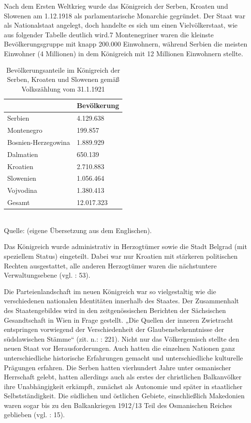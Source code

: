 Nach dem Ersten Weltkrieg wurde das Königreich der Serben, Kroaten und Slowenen am 1.12.1918 als parlamentarische Monarchie gegründet. Der Staat war als Nationalstaat angelegt, doch handelte es sich um einen Vielvölkerstaat, wie aus folgender Tabelle deutlich wird.7 Montenegriner waren die kleinste Bevölkerungsgruppe mit knapp 200.000 Einwohnern, während Serbien die meisten Einwohner (4 Millionen) in dem Königreich mit 12 Millionen Einwohnern stellte.
\begin{table}[H]
\caption[Bevölkerungsanteile im Königreich der Serben, Kroaten und Slowenen]{Bevölkerungsanteile im Königreich der Serben, Kroaten und Slowenen gemäß Volkszählung vom 31.1.1921}
\center

\begin{tabular}{|R{46mm}|R{25mm}|}\hline
&Bevölkerung\\\hline
Serbien &4.129.638\\\hline
Montenegro&199.857\\\hline
Bosnien-Herzegowina&1.889.929\\\hline
Dalmatien&650.139\\\hline
Kroatien&2.710.883\\\hline
Slowenien&1.056.464\\\hline
Vojvodina&1.380.413\\\hline
Gesamt&12.017.323\\\hline
\end{tabular}\\
\vspace{0,5cm}
Quelle: \cite{beardradin} (eigene Übersetzung aus dem Englischen).
\end{table}
Das Königreich wurde administrativ in Herzogtümer sowie die Stadt Belgrad (mit speziellem Status) eingeteilt. Dabei war nur Kroatien mit stärkeren politischen Rechten ausgestattet, alle anderen Herzogtümer waren die nächstuntere Verwaltungsebene (vgl. \cite{sevic} : 53).\par
Die Parteienlandschaft im neuen Königreich war so vielgestaltig wie die verschiedenen nationalen Identitäten innerhalb des Staates. Der Zusammenhalt des Staatengebildes wird in den zeitgenössischen Berichten der Sächsischen Gesandtschaft in Wien in Frage gestellt. „Die Quellen der inneren Zwietracht entspringen vorwiegend der Verschiedenheit der Glaubensbekenntnisse der südslawischen Stämme“ (zit. n.: \cite{opitz} : 221). Nicht nur das Völkergemisch stellte den neuen Staat vor Herausforderungen. Auch hatten die einzelnen Nationen ganz unterschiedliche historische Erfahrungen gemacht und unterschiedliche kulturelle Prägungen erfahren. Die Serben hatten vierhundert Jahre unter osmanischer Herrschaft gelebt, hatten allerdings auch als erstes der christlichen Balkanvölker ihre Unabhängigkeit erkämpft, zunächst als Autonomie und später in staatlicher Selbstständigkeit. Die südlichen und östlichen Gebiete, einschließlich Makedonien waren sogar bis zu den Balkankriegen 1912/13 Teil des Osmanischen Reiches geblieben (vgl. \cite{libal} : 15).
